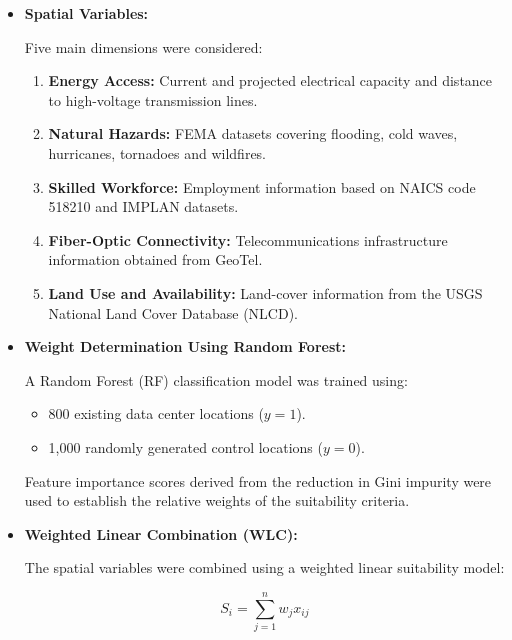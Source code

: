 \begin{itemize}

    \item \textbf{Spatial Variables:}

    Five main dimensions were considered:

    \begin{enumerate}
        \item \textbf{Energy Access:}
        Current and projected electrical capacity and distance to high-voltage transmission lines.

        \item \textbf{Natural Hazards:}
        FEMA datasets covering flooding, cold waves, hurricanes, tornadoes and wildfires.

        \item \textbf{Skilled Workforce:}
        Employment information based on NAICS code 518210 and IMPLAN datasets.

        \item \textbf{Fiber-Optic Connectivity:}
        Telecommunications infrastructure information obtained from GeoTel.

        \item \textbf{Land Use and Availability:}
        Land-cover information from the USGS National Land Cover Database (NLCD).
    \end{enumerate}

    \item \textbf{Weight Determination Using Random Forest:}

    A Random Forest (RF) classification model was trained using:

    \begin{itemize}
        \item 800 existing data center locations ($y=1$).
        \item 1,000 randomly generated control locations ($y=0$).
    \end{itemize}

    Feature importance scores derived from the reduction in Gini impurity were used to establish the relative weights of the suitability criteria.

    \item \textbf{Weighted Linear Combination (WLC):}

    The spatial variables were combined using a weighted linear suitability model:

    \[
        S_i = \sum_{j=1}^{n} w_j x_{ij}
    \]


\end{itemize}
